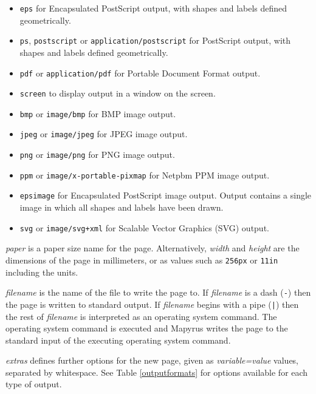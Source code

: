 \begin{itemize}
\item
\texttt{eps} for Encapsulated PostScript output,
with shapes and labels defined geometrically.
\item
\texttt{ps}, \texttt{postscript} or \texttt{application/postscript}
for PostScript output,
with shapes and labels defined geometrically.
\item
\texttt{pdf} or \texttt{application/pdf} for Portable Document
Format output.
\item
\texttt{screen} to display output in a window on the screen.
\item
\texttt{bmp} or \texttt{image/bmp} for BMP image output.
\item
\texttt{jpeg} or \texttt{image/jpeg} for JPEG image output.
\item
\texttt{png} or \texttt{image/png} for PNG image output.
\item
\texttt{ppm} or \texttt{image/x-portable-pixmap} for Netpbm PPM image output.
\item
\texttt{epsimage} for Encapsulated PostScript image output.
Output contains
a single image in which all shapes and labels have been drawn.
\item
\texttt{svg} or \texttt{image/svg+xml} for Scalable Vector Graphics
(SVG) output.
\end{itemize}

\textit{paper} is a paper size name for the page.
Alternatively, \textit{width} and \textit{height} are the dimensions of the page
in millimeters, or as values such as \texttt{256px} or \texttt{11in}
including the units.

\textit{filename} is the name of the file to write the page to.
If \textit{filename} is a dash (\texttt{-})
then the page is written to standard output.
If \textit{filename} begins with a pipe (\texttt{|}) then the rest
of \textit{filename} is interpreted as an operating system
command.  The operating system command is executed and Mapyrus
writes the page to the standard input of the executing
operating system command.

\textit{extras} defines further options for the new page, given as
\textit{variable=value} values, separated by whitespace.
See Table \ref{outputformats}
for options available for each type of output.

